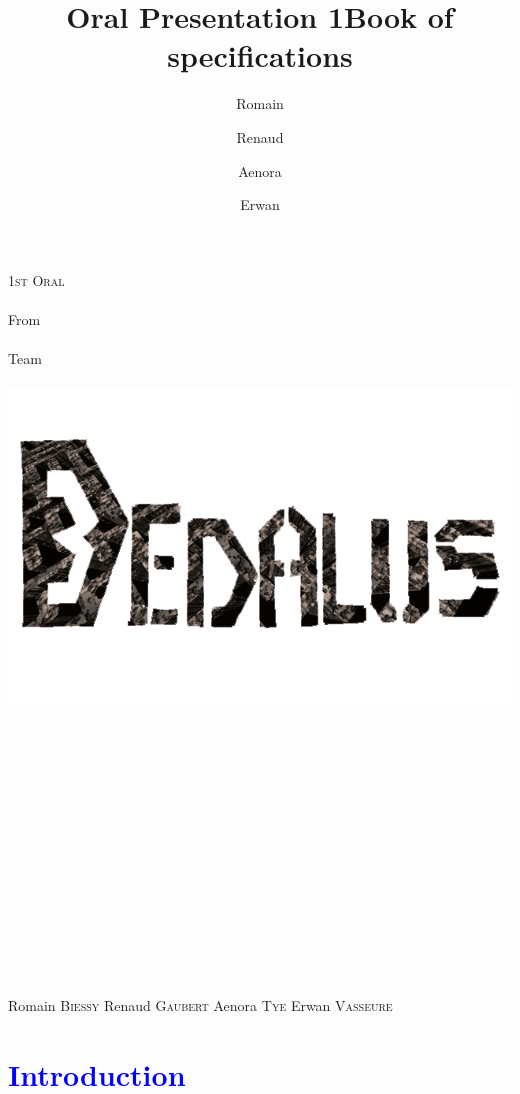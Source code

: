 \documentclass[article]{report}             %
\title {Oral Presentation 1}
\title {Book of specifications}
\author {Romain\and Renaud\and Aenora\and Erwan}
\date {}
\begin{document}
	\thispagestyle{empty}
  	\begin{titlepage} 
		\vspace*{1cm} 
  		\begin{center} 
  			{\huge{\textsc{1st Oral} \\ ~ \\{\large From}\\ ~\\ Team \\  ~ \\ }}
	  		\includegraphics[width = 14cm]{images/Titles/Dedalus.png}
			\\ ~ \\ ~ \\ ~ \\ ~ \\ ~ \\ ~ \\ ~ \\ ~ \\ ~ \\ ~ \\ ~ \\ ~ \\ ~ \\ ~ 
		\end{center}
  		\hfill {\large Romain \textsc{Biessy}}
  		\hfill {\large Renaud \textsc{Gaubert}}
  		\hfill {\large Aenora \textsc{Tye}}
  		\hfill {\large Erwan  \textsc{Vasseure}}
  	\end{titlepage} 

  	\tableofcontents
  		\newpage
		
		\chapter{\textcolor{blue}{Introduction}}
 											
\end{document}
